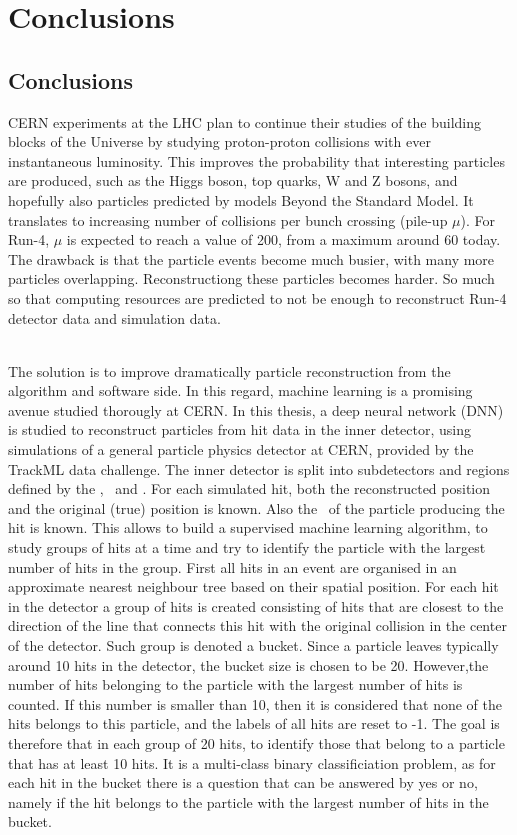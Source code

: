 \chapter{Conclusions}
\label{Conclusions}

\section{Conclusions}

CERN experiments at the LHC plan to continue their studies of the building blocks of the Universe by studying proton-proton collisions with ever instantaneous luminosity. This improves the probability that interesting particles are produced, such as the Higgs boson, top quarks, W and Z bosons, and hopefully also particles predicted by models Beyond the Standard Model. It translates to increasing number of collisions per bunch crossing (pile-up $\mu$). For Run-4, $\mu$ is expected to reach a value of 200, from a maximum around 60 today. The drawback is that the particle events become much busier, with many more particles overlapping. Reconstructiong these particles becomes harder. So much so that computing resources are predicted to not be enough to reconstruct Run-4 detector data and simulation data. 

\ \\The solution is to improve dramatically particle reconstruction from the algorithm and software side. In this regard, machine learning is a promising avenue studied thorougly at CERN. In this thesis, a deep neural network (DNN) is studied to reconstruct particles from hit data in the inner detector, using simulations of a general particle physics detector at CERN, provided by the TrackML data challenge. The inner detector is split into subdetectors and regions defined by the \volumeID, \layerID~and \moduleID. For each simulated hit, both the reconstructed position and the original (true) position is known. Also the \particleID~of the particle producing the hit is known. This allows to build a supervised machine learning algorithm, to study groups of hits at a time and try to identify the particle with the largest number of hits in the group. First all hits in an event are organised in an approximate nearest neighbour tree based on their spatial position. For each hit in the detector a group of hits is created consisting of hits that are closest to the direction of the line that connects this hit with the original collision in the center of the detector. Such group is denoted a bucket. Since a particle leaves typically around 10 hits in the detector, the bucket size is chosen to be 20. However,the number of hits belonging to the particle with the largest number of hits is counted. If this number is smaller than 10, then it is considered that none of the hits belongs to this particle, and the labels of all hits are reset to -1. The goal is therefore that in each group of 20 hits, to identify those that belong to a particle that has at least 10 hits. It is a multi-class binary classificiation problem, as for each hit in the bucket there is a question that can be answered by yes or no, namely if the hit belongs to the particle with the largest number of hits in the bucket. 

